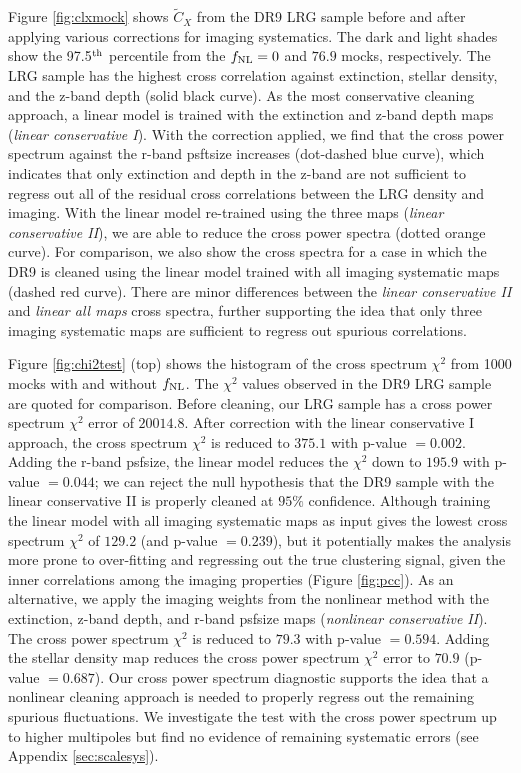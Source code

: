 Figure \ref{fig:clxmock} shows $\tilde{C}_{X}$ from the DR9 LRG sample before and after applying various corrections for imaging systematics. The dark and light shades show the 97.5$^{\rm th}$ percentile from the $f_{\rm NL}=0$ and $76.9$ mocks, respectively. The LRG sample has the highest cross correlation against extinction, stellar density, and the z-band depth (solid black curve). As the most conservative cleaning approach, a linear model is trained with the extinction and z-band depth maps (\textit{linear conservative I}). With the correction applied, we find that the cross power spectrum against the r-band psftsize increases (dot-dashed blue curve), which indicates that only extinction and depth in the z-band are not sufficient to regress out all of the residual cross correlations between the LRG density and imaging. With the linear model re-trained using the three maps (\textit{linear conservative II}), we are able to reduce the cross power spectra (dotted orange curve). For comparison, we also show the cross spectra for a case in which the DR9 is cleaned using the linear model trained with all imaging systematic maps (dashed red curve). There are minor differences between the \textit{linear conservative II} and \textit{linear all maps} cross spectra, further supporting the idea that only three imaging systematic maps are sufficient to regress out spurious correlations.

Figure \ref{fig:chi2test} (top)  shows the histogram of the cross spectrum $\chi^{2}$ from 1000 mocks with and without $f_{\rm NL}$. The $\chi^{2}$ values observed in the DR9 LRG sample are quoted for comparison. Before cleaning, our LRG sample has a cross power spectrum $\chi^{2}$ error of $20014.8$. After correction with the linear conservative I approach, the cross spectrum $\chi^{2}$ is reduced to $375.1$ with p-value $=0.002$. Adding the r-band psfsize, the linear model reduces the $\chi^{2}$ down to $195.9$ with p-value $=0.044$; we can reject the null hypothesis that the DR9 sample with the linear conservative II is properly cleaned at $95\%$ confidence. Although training the linear model with all imaging systematic maps as input gives the lowest cross spectrum $\chi^{2}$ of $129.2$ (and p-value $=0.239$), but it potentially makes the analysis more prone to over-fitting and regressing out the true clustering signal, given the inner correlations among the imaging properties (Figure \ref{fig:pcc}). As an alternative, we apply the imaging weights from the nonlinear method with the extinction, z-band depth, and r-band psfsize maps (\textit{nonlinear conservative II}). The cross power spectrum $\chi^{2}$ is reduced to $79.3$ with p-value $=0.594$.  Adding the stellar density map reduces the cross power spectrum $\chi^{2}$ error to $70.9$ (p-value $=0.687$). Our cross power spectrum diagnostic supports the idea that a nonlinear cleaning approach is needed to properly regress out the remaining spurious fluctuations. We investigate the test with the cross power spectrum up to higher multipoles but find no evidence of remaining systematic errors (see Appendix \ref{sec:scalesys}). 


